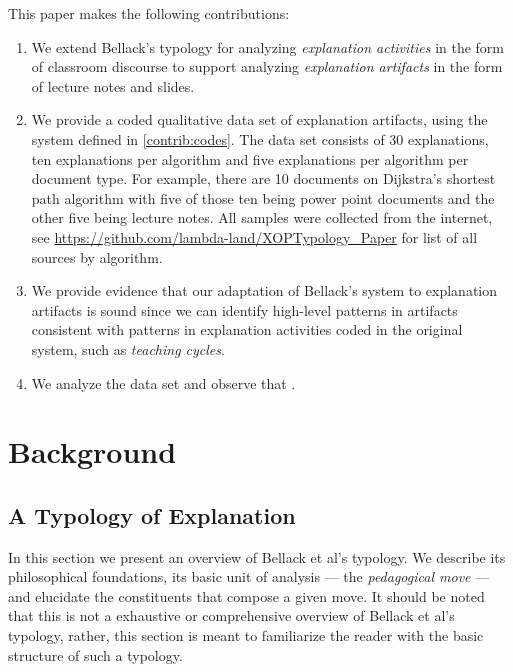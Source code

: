 \documentclass[conference]{IEEEtran}
\begin{document}
This paper makes the following contributions:
%
\begin{enumerate}[C1.]

\item \label{contrib:codes}
%
We extend Bellack's typology for analyzing \emph{explanation activities} in the
form of classroom discourse to support analyzing \emph{explanation artifacts}
in the form of lecture notes and slides.

\item \label{contrib:data}
%
We provide a coded qualitative data set of explanation artifacts, using the
system defined in \ref{contrib:codes}. The data set consists of 30
explanations, ten explanations per algorithm and five explanations per algorithm
per document type. For example, there are 10 documents on Dijkstra's shortest
path algorithm with five of those ten being power point documents and the other
five being lecture notes. All samples were collected from the internet, see
\url{https://github.com/lambda-land/XOPTypology_Paper} for list of all sources
by algorithm. 

\item \label{contrib:valid}
%
We provide evidence that our adaptation of Bellack's system to explanation
artifacts is sound since we can identify high-level patterns in artifacts
consistent with patterns in explanation activities coded in the original
system, such as \emph{teaching cycles}.

\item \label{contrib:valid}
%
We analyze the data set and observe that .

\end{enumerate}

\section{Background}
\subsection{A Typology of Explanation}
In this section we present an overview of Bellack et al's typology. We describe
its philosophical foundations, its basic unit of analysis --- the
\emph{pedagogical move} --- and elucidate the constituents that compose a given
move. It should be noted that this is not a exhaustive or comprehensive overview
of Bellack et al's typology, rather, this section is meant to familiarize the
reader with the basic structure of such a typology.
\end{document}
